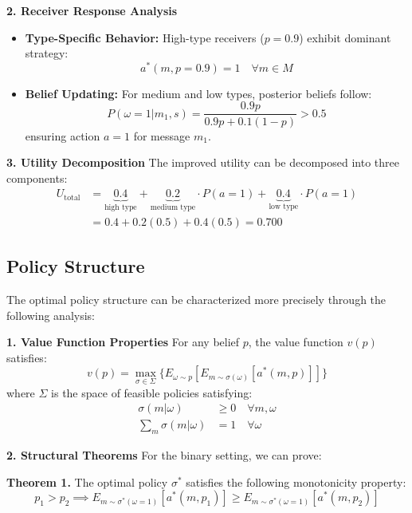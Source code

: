 \documentclass[12pt]{article}
\begin{document}
\textbf{2. Receiver Response Analysis}
\begin{itemize}
    \item \textbf{Type-Specific Behavior:} High-type receivers ($p=0.9$) exhibit dominant strategy:
    \begin{equation}
        a^*(m,p=0.9) = 1 \quad \forall m \in M
    \end{equation}
    
    \item \textbf{Belief Updating:} For medium and low types, posterior beliefs follow:
    \begin{equation}
        P(\omega=1|m_1,s) = \frac{0.9p}{0.9p + 0.1(1-p)} > 0.5
    \end{equation}
    ensuring action $a=1$ for message $m_1$.
\end{itemize}

\textbf{3. Utility Decomposition}
The improved utility can be decomposed into three components:
\begin{align*}
    U_{\text{total}} &= \underbrace{0.4}_{\text{high type}} + \underbrace{0.2}_{\text{medium type}} \cdot P(a=1) + \underbrace{0.4}_{\text{low type}} \cdot P(a=1) \\
    &= 0.4 + 0.2(0.5) + 0.4(0.5) = 0.700
\end{align*}

\subsection{Policy Structure}
The optimal policy structure can be characterized more precisely through the following analysis:

\textbf{1. Value Function Properties}
For any belief $p$, the value function $v(p)$ satisfies:
\begin{equation}
    v(p) = \max_{\sigma \in \Sigma} \{E_{\omega \sim p}[E_{m \sim \sigma(\omega)}[a^*(m,p)]]\}
\end{equation}
where $\Sigma$ is the space of feasible policies satisfying:
\begin{align*}
    \sigma(m|\omega) &\geq 0 \quad \forall m,\omega \\
    \sum_m \sigma(m|\omega) &= 1 \quad \forall \omega
\end{align*}

\textbf{2. Structural Theorems}
For the binary setting, we can prove:

\textbf{Theorem 1.} The optimal policy $\sigma^*$ satisfies the following monotonicity property:
\begin{equation}
    p_1 > p_2 \implies E_{m \sim \sigma^*(\omega=1)}[a^*(m,p_1)] \geq E_{m \sim \sigma^*(\omega=1)}[a^*(m,p_2)]
\end{equation}
\end{document}
